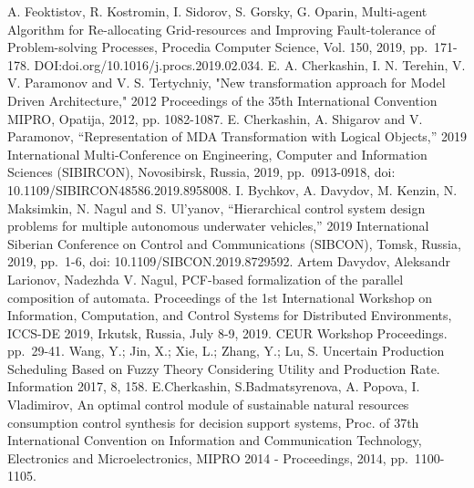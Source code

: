 \documentclass[runningheads]{llncs}
\begin{document}
\begin{thebibliography}{999}
    \makeatletter
    \def\@biblabel#1{[#1]}
    \makeatother
     A. Feoktistov, R. Kostromin, I. Sidorov, S. Gorsky, G. Oparin, Multi-agent Algorithm for Re-allocating Grid-resources and Improving Fault-tolerance of Problem-solving Processes, Procedia Computer Science, Vol. 150, 2019, pp. 171-178. DOI:doi.org/10.1016/j.procs.2019.02.034.
     E. A. Cherkashin, I. N. Terehin, V. V. Paramonov and V. S. Tertychniy, "New transformation approach for Model Driven Architecture," 2012 Proceedings of the 35th International Convention MIPRO, Opatija, 2012, pp. 1082-1087.
     E. Cherkashin, A. Shigarov and V. Paramonov, “Representation of MDA Transformation with Logical Objects,” 2019 International Multi-Conference on Engineering, Computer and Information Sciences (SIBIRCON), Novosibirsk, Russia, 2019, pp. 0913-0918, doi: 10.1109/SIBIRCON48586.2019.8958008.
     I. Bychkov, A. Davydov, M. Kenzin, N. Maksimkin, N. Nagul and S. Ul’yanov, “Hierarchical control system design problems for multiple autonomous underwater vehicles,” 2019 International Siberian Conference on Control and Communications (SIBCON), Tomsk, Russia, 2019, pp. 1-6, doi: 10.1109/SIBCON.2019.8729592.
     Artem Davydov, Aleksandr Larionov, Nadezhda V. Nagul, PCF-based formalization of the parallel composition of automata. Proceedings of the 1st International Workshop on Information, Computation, and Control Systems for Distributed Environments, ICCS-DE 2019, Irkutsk, Russia, July 8-9, 2019. CEUR Workshop Proceedings. pp. 29-41.
     Wang, Y.; Jin, X.; Xie, L.; Zhang, Y.; Lu, S. Uncertain Production Scheduling Based on Fuzzy Theory Considering Utility and Production Rate. Information 2017, 8, 158.
     E.Cherkashin, S.Badmatsyrenova, A. Popova, I. Vladimirov, An optimal control module of sustainable natural resources consumption control synthesis for decision support systems, Proc. of 37th International Convention on Information and Communication Technology, Electronics and Microelectronics, MIPRO 2014 - Proceedings, 2014, pp. 1100-1105.


\end{thebibliography}
\end{document}
